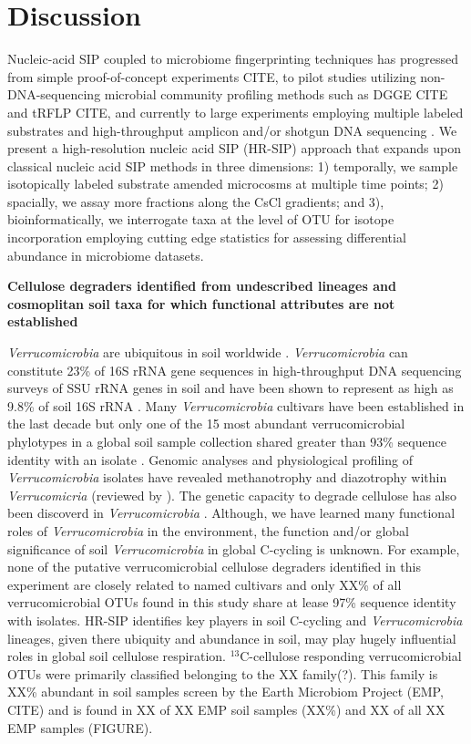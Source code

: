 \section{Discussion}
Nucleic-acid SIP coupled to microbiome fingerprinting techniques has progressed
from simple proof-of-concept experiments  CITE, to pilot studies utilizing
non-DNA-sequencing microbial community profiling methods such as DGGE CITE and
tRFLP CITE, and currently to large experiments employing multiple 
labeled substrates and high-throughput amplicon and/or shotgun DNA sequencing 
\citep{Verastegui_2014}. We present a high-resolution nucleic acid SIP (HR-SIP) 
approach that expands upon classical nucleic acid SIP methods in three dimensions:
1) temporally, we sample isotopically labeled substrate amended microcosms at multiple 
time points; 2) spacially, we assay more fractions along the CsCl gradients; and 3), 
bioinformatically, we interrogate taxa at the level of OTU for isotope incorporation
employing cutting edge statistics for assessing differential abundance in microbiome
datasets.

\textbf{Cellulose degraders identified from undescribed lineages and cosmoplitan
soil taxa for which functional attributes are not established}

\textit{Verrucomicrobia} are ubiquitous in soil worldwide \citep{Bergmann_2011}. 
\textit{Verrucomicrobia} 
can constitute 23\% of 16S rRNA gene sequences in high-throughput DNA sequencing surveys of 
SSU rRNA genes in soil \citep{Bergmann_2011} and
have been shown to represent as high as 9.8\% of soil 16S rRNA \citep{Buckley_2001}. Many
\textit{Verrucomicrobia} cultivars
have been established in the last decade \cite{Wertz_2011} but only one of the 15 most abundant 
verrucomicrobial phylotypes in a global soil sample collection shared greater than 93\% sequence
identity with an isolate \citep{Bergmann_2011}. Genomic analyses and physiological 
profiling of \textit{Verrucomicrobia} isolates have revealed methanotrophy and diazotrophy 
within \textit{Verrucomicria} (reviewed by \citet{Wertz_2011}). The genetic capacity to degrade cellulose
has also been discoverd in \textit{Verrucomicrobia} \citep{Wertz_2011}. Although, we have
learned many functional roles of \textit{Verrucomicrobia} in the environment, the function and/or
global significance of soil \textit{Verrucomicrobia} in global C-cycling is unknown. For example, 
none of the putative verrucomicrobial cellulose degraders identified in this experiment are
closely related to named cultivars and only XX\% of all verrucomicrobial OTUs found in this study
share at lease 97\% sequence identity with isolates. HR-SIP identifies key players in soil
C-cycling 
and \textit{Verrucomicrobia} lineages, given there ubiquity and abundance in soil, may play 
hugely influential roles in global soil cellulose respiration. $^{13}$C-cellulose responding
verrucomicrobial OTUs were primarily classified belonging to the XX family(?). This family 
is XX\% abundant in soil samples screen by the Earth Microbiom Project (EMP, CITE) and is
found in XX of XX EMP soil samples (XX\%) and XX of all XX EMP samples (FIGURE). 

